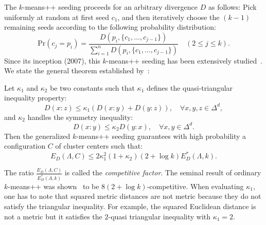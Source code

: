 \documentclass[graybox]{svmult}
\begin{document}
The $k$-means++ seeding proceeds for an arbitrary divergence $D$ as follows:
Pick uniformly at random at first seed $c_1$, and then iteratively choose the
$(k-1)$ remaining seeds according to the following probability distribution:
$$
\mathrm{Pr}(c_j=p_i) =
\frac{D(p_i,\{c_1,\ldots,c_{j-1}\})}
{\sum_{i=1}^n D(p_i,\{c_1,\ldots,c_{j-1}\})}
\quad(2\le{j}\le{k}).
$$
Since its inception (2007), this $k$-means++ seeding has been extensively studied~\cite{Bachem-2016}.
We state the general theorem established by~\cite{tJ-2013}:
\begin{theorem}\label{thm:kmeansplus}
Let $\kappa_1$ and $\kappa_2$ be two constants such that $\kappa_1$ defines the
quasi-triangular inequality property:
$$
D(x:z) \leq \kappa_1 \left(D(x:y)+D(y:z)\right),\quad\forall{}x,y,z\in\Delta^d,
$$
and $\kappa_2$ handles the symmetry inequality:
$$
D(x:y)\leq \kappa_2 D(y:x),\quad\forall x,y\in\Delta^d.
$$
Then the generalized $k$-means++ seeding guarantees with high probability a configuration $C$ of cluster centers such that:
\begin{equation}\label{eq:kmperf}
E_D(\Lambda,C)\leq 2\kappa_1^2(1+\kappa_2)(2+\log k) E_D^*(\Lambda,k).
\end{equation}
\end{theorem}
The ratio $\frac{E_D(\Lambda,C)}{E_D^*(\Lambda,k)}$ is called the {\em competitive factor}.
The seminal result of ordinary $k$-means++ was shown~\cite{kmeanspp-2007} to be $8(2+\log{k})$-competitive.
When evaluating $\kappa_1$, one has to note that squared metric distances are not metric because they do not satisfy the triangular inequality.
For example, the squared Euclidean distance is not a metric but it satisfies the $2$-quasi triangular inequality with $\kappa_1=2$.
\end{document}
